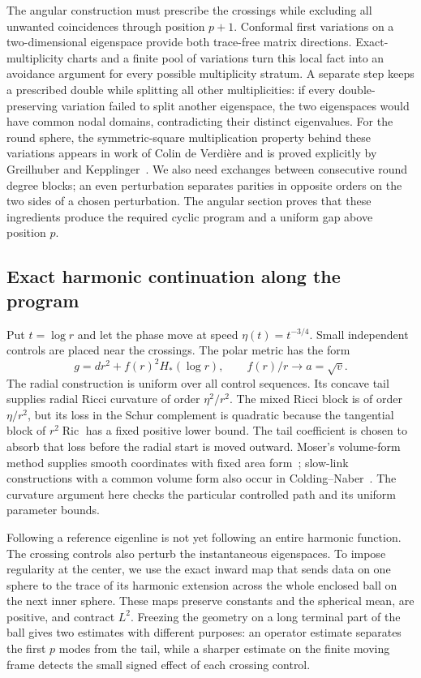The angular construction must prescribe the crossings while excluding all
unwanted coincidences through position $p+1$. Conformal first variations on
a two-dimensional eigenspace provide both trace-free matrix directions.
Exact-multiplicity charts and a finite pool of variations turn this local
fact into an avoidance argument for every possible multiplicity stratum.
A separate step keeps a prescribed double while splitting all other
multiplicities: if every double-preserving variation failed to split
another eigenspace, the two eigenspaces would have common nodal domains,
contradicting their distinct eigenvalues. For the round sphere, the
symmetric-square multiplication property behind
these variations appears in work of Colin de Verdi\`ere and is proved
explicitly by Greilhuber and Kepplinger~\cite{ColinDeVerdiere,GreilhuberKepplinger}.
We also need exchanges between consecutive round degree blocks; an even
perturbation separates parities in opposite orders on the two sides of a
chosen perturbation. The angular section proves that these ingredients
produce the required cyclic program and a uniform gap above position $p$.

\subsection*{Exact harmonic continuation along the program}

Put $t=\log r$ and let the phase move at speed $\eta(t)=t^{-3/4}$. Small
independent controls are placed near the crossings. The polar metric has
the form
\[
 g=dr^2+f(r)^2H_*(\log r),\qquad f(r)/r\longrightarrow a=\sqrt v.
\]
The radial construction is uniform over all control sequences. Its concave
tail supplies radial Ricci curvature of order $\eta^2/r^2$. The mixed Ricci
block is of order $\eta/r^2$, but its loss in the Schur complement is
quadratic because the tangential block of $r^2\operatorname{Ric}$ has a
fixed positive lower bound.
The tail coefficient is chosen to absorb that loss before the radial start
is moved outward. Moser's volume-form method supplies smooth coordinates
with fixed area form~\cite{Moser}; slow-link constructions with a common volume form
also occur in Colding--Naber~\cite{ColdingNaber}. The curvature argument
here checks the particular controlled path and its uniform parameter bounds.

Following a reference eigenline is not yet following an entire harmonic
function. The crossing controls also perturb the instantaneous eigenspaces.
To impose regularity at the center, we use the exact inward map
that sends data on one sphere to the trace of its harmonic extension across
the whole enclosed ball on the next inner sphere. These maps preserve
constants and the spherical mean, are positive, and contract $L^2$. Freezing
the geometry on a long terminal part of the ball gives two estimates with
different purposes: an operator estimate separates the first $p$ modes from
the tail, while a sharper estimate on the finite moving frame detects the
small signed effect of each crossing control.

